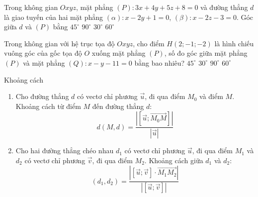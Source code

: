 	\begin{ex}%
	Trong không gian $Oxyz$, mặt phẳng $(P) \colon 3x+4y+5z+8=0$ và đường thẳng $d$ là giao tuyến của hai mặt phẳng $(\alpha) \colon x-2y+1=0$, $(\beta) \colon x-2z-3=0$. Góc giữa $d$ và $(P)$ bằng
	\choice
	{$45^\circ$}
	{$90^\circ$}
	{$30^\circ$}
	{\True $60^\circ$}
	\end{ex}
	\begin{ex}%
	Trong không gian với hệ trục tọa độ $Oxyz$, cho điểm $H(2;-1;-2)$ là hình chiếu vuông góc của gốc tọa độ $O$ xuống mặt phẳng $(P)$, số đo góc giữa mặt phẳng $(P)$ và mặt phẳng $(Q)\colon x-y-11=0$ bằng bao nhiêu?
	\choice
	{\True $45^\circ$}
	{$30^\circ$}
	{$90^\circ$}
	{$60^\circ$}
	\end{ex}
	\begin{dang}{Khoảng cách}%
	\begin{enumerate}
	\item Cho đường thẳng $d$ có vectơ chỉ phương $\vec{u}$, đi qua điểm $M_0$ và điểm $ M $. Khoảng cách từ điểm $ M $ đến đường thẳng $ d $:
	$$ d\left(M,d\right)=\dfrac{|\left[\vec{u};\vec{M_0M}\right]|}{|\vec{u}|}$$
	\item Cho hai đường thẳng chéo nhau $d_1$ có vectơ chỉ phương $\vec{u}$, đi qua điểm $M_1 $ và $d_2$ có vectơ chỉ phương $\vec{v}$, đi qua điểm $M_2$. Khoảng cách giữa $ d_1 $ và $ d_2 $:
	$$\left(d_1,d_2\right)=\dfrac{\left|\left[\vec{u};\vec{v}\right]\cdot\vec{M_1M_2}\right|}{|\left[\vec{u};\vec{v}\right]|}$$
	\end{enumerate}
\end{dang}
\setcounter{subsubsection}{0}
\setcounter{vd}{0}
\setcounter{ex}{0}
